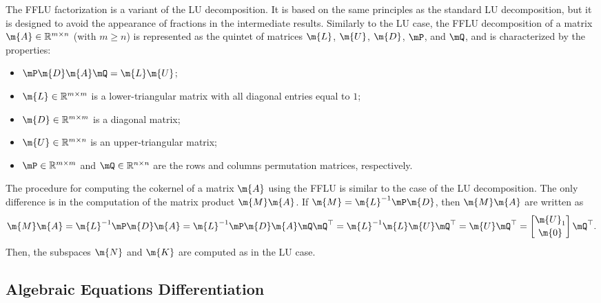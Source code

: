 The \ac{FFLU} factorization is a variant of the \ac{LU} decomposition. It is based on the same principles as the standard \ac{LU} decomposition, but it is designed to avoid the appearance of fractions in the intermediate results. Similarly to the \ac{LU} case, the \ac{FFLU} decomposition of a matrix $\m{A} \in \mathbb{R}^{m \times n}$ (with $m\geq n$) is represented as the quintet of matrices $\m{L}$, $\m{U}$, $\m{D}$, $\mP$, and $\mQ$, and is characterized by the properties:
%
\begin{itemize}
  \setlength{\itemsep}{0.0em}
  \item $\mP\m{D}\m{A}\mQ = \m{L}\m{U}$;
  \item $\m{L} \in \mathbb{R}^{m \times m}$ is a lower-triangular matrix with all diagonal entries equal to $1$;
  \item $\m{D} \in \mathbb{R}^{m \times m}$ is a diagonal matrix;
  \item $\m{U} \in \mathbb{R}^{m \times n}$ is an upper-triangular matrix;
  \item $\mP \in \mathbb{R}^{m \times m}$ and $\mQ \in \mathbb{R}^{n \times n}$ are the rows and columns permutation matrices, respectively.
\end{itemize}
%
The procedure for computing the cokernel of a matrix $\m{A}$ using the \ac{FFLU} is similar to the case of the \ac{LU} decomposition. The only difference is in the computation of the matrix product $\m{M}\m{A}$. If $\m{M} = \m{L}^{-1}\mP\m{D}$, then $\m{M}\m{A}$ are written as
%
\begin{equation*}
  \m{M}\m{A}
  = \m{L}^{-1}\mP\m{D}\m{A}
  = \m{L}^{-1}\mP\m{D}\m{A}\mQ\mQ^\top
  = \m{L}^{-1}\m{L}\m{U}\mQ^\top
  = \m{U}\mQ^\top = \begin{bmatrix} \m{U}_1 \\[0.2em] \m{0} \end{bmatrix}\mQ^\top \text{.}
\end{equation*}
%
Then, the subspaces $\m{N}$ and $\m{K}$ are computed as in the \ac{LU} case.

\subsection{Algebraic Equations Differentiation}
\label{chap4:sec:differentiation}

